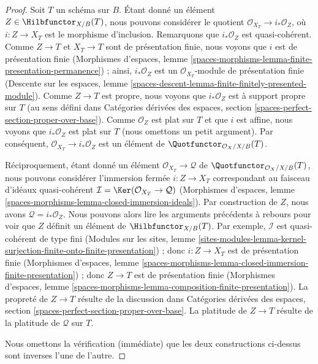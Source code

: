 \begin{proof}
Soit $T$ un schéma sur $B$. Étant donné un élément
$Z \in \Hilbfunctor_{X/B}(T)$, nous pouvons considérer le quotient
$\mathcal{O}_{X_T} \to i_*\mathcal{O}_Z$, où $i : Z \to X_T$ est le
morphisme d'inclusion. Remarquons que $i_*\mathcal{O}_Z$ est quasi-cohérent.
Comme $Z \to T$ et $X_T \to T$ sont de présentation finie, nous voyons que
$i$ est de présentation finie (Morphismes d'espaces, lemme
\ref{spaces-morphisms-lemma-finite-presentation-permanence}) ; ainsi,
$i_*\mathcal{O}_Z$ est un $\mathcal{O}_{X_T}$-module de présentation finie
(Descente sur les espaces, lemme
\ref{spaces-descent-lemma-finite-finitely-presented-module}). Comme
$Z \to T$ est propre, nous voyons que $i_*\mathcal{O}_Z$ est à support propre
sur $T$ (au sens défini dans Catégories dérivées des espaces, section
\ref{spaces-perfect-section-proper-over-base}). Comme $\mathcal{O}_Z$ est plat
sur $T$ et que $i$ est affine, nous voyons que $i_*\mathcal{O}_Z$ est plat sur
$T$ (nous omettons un petit argument). Par conséquent,
$\mathcal{O}_{X_T} \to i_*\mathcal{O}_Z$ est un élément de
$\Quotfunctor_{\mathcal{O}_X/X/B}(T)$.

\medskip\noindent
Réciproquement, étant donné un élément
$\mathcal{O}_{X_T} \to \mathcal{Q}$ de
$\Quotfunctor_{\mathcal{O}_X/X/B}(T)$, nous pouvons considérer l'immersion
fermée $i : Z \to X_T$ correspondant au faisceau d'idéaux quasi-cohérent
$\mathcal{I} = \Ker(\mathcal{O}_{X_T} \to \mathcal{Q})$ (Morphismes
d'espaces, lemme \ref{spaces-morphisms-lemma-closed-immersion-ideals}). Par
construction de $Z$, nous avons $\mathcal{Q} = i_*\mathcal{O}_Z$. Nous pouvons
alors lire les arguments précédents à rebours pour voir que $Z$ définit un
élément de $\Hilbfunctor_{X/B}(T)$. Par exemple, $\mathcal{I}$ est
quasi-cohérent de type fini (Modules sur les sites, lemme
\ref{sites-modules-lemma-kernel-surjection-finite-onto-finite-presentation}) ;
donc $i : Z \to X_T$ est de présentation finie (Morphismes d'espaces, lemme
\ref{spaces-morphisms-lemma-closed-immersion-finite-presentation}) ; donc
$Z \to T$ est de présentation finie (Morphismes d'espaces, lemme
\ref{spaces-morphisms-lemma-composition-finite-presentation}). La propreté de
$Z \to T$ résulte de la discussion dans Catégories dérivées des espaces,
section \ref{spaces-perfect-section-proper-over-base}. La platitude de
$Z \to T$ résulte de la platitude de $\mathcal{Q}$ sur $T$.

\medskip\noindent
Nous omettons la vérification (immédiate) que les deux constructions ci-dessus
sont inverses l'une de l'autre.
\end{proof}

